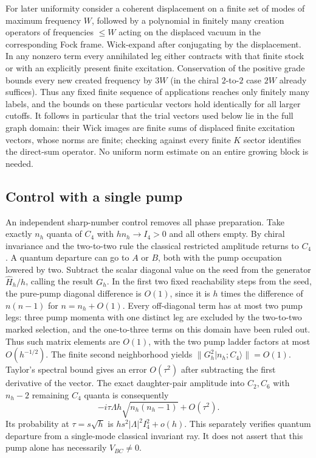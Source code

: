\documentclass[11pt]{article}
\numberwithin{equation}{section}
\begin{document}
For later uniformity consider a coherent displacement on a
finite set of modes of maximum frequency \(W\), followed by a
polynomial in finitely many creation operators of frequencies
\(\le W\) acting on the displaced vacuum in the corresponding
Fock frame. Wick-expand after conjugating by the displacement.
In any nonzero term every annihilated leg either contracts
with that finite stock or with an explicitly present finite
excitation. Conservation of the positive grade bounds every
new created frequency by \(3W\) (in the chiral \(2\)-to-\(2\)
case \(2W\) already suffices). Thus any fixed finite sequence
of applications reaches only finitely many labels, and the
bounds on these particular vectors hold identically for all
larger cutoffs. It follows in particular that the trial vectors
used below lie in the full graph domain: their Wick images
are finite sums of displaced finite excitation vectors, whose
norms are finite; checking against every finite \(K\) sector
identifies the direct-sum operator. No uniform norm estimate
on an entire growing block is needed.

\subsection{Control with a single pump}

An independent sharp-number control removes all phase
preparation. Take exactly \(n_h\) quanta of \(C_4\) with
\(h n_h\to I_4>0\) and all others empty. By chiral invariance
and the two-to-two rule the classical restricted amplitude
returns to \(C_4\). A quantum departure can go to \(A\) or
\(B\), both with the pump occupation lowered by two.
Subtract the scalar diagonal value on the seed from the
generator \(\widehat H_h/h\), calling the result \(G_h\).
In the first two fixed reachability steps from the seed,
the pure-pump diagonal difference is \(O(1)\), since it
is \(h\) times the difference of \(n(n-1)\) for
\(n=n_h+O(1)\). Every off-diagonal term has at most two
pump legs: three pump momenta with one distinct leg are
excluded by the two-to-two marked selection, and the
one-to-three terms on this domain have been ruled out.
Thus such matrix elements are \(O(1)\), with the two pump
ladder factors at most \(O(h^{-1/2})\).
The finite second neighborhood yields
\(\|G_h^2|n_h;C_4\rangle\|=O(1)\).
Taylor's spectral bound gives an error \(O(\tau^2)\)
after subtracting the first derivative of the vector.
The exact daughter-pair amplitude into \(C_2,C_6\) with
\(n_h-2\) remaining \(C_4\) quanta is consequently
\[
 -i\tau\Lambda h\sqrt{n_h(n_h-1)}+O(\tau^2).
\]
Its probability at \(\tau=s\sqrt h\) is
\(h s^2|\Lambda|^2I_4^2+o(h)\).
This separately verifies quantum departure from a
single-mode classical invariant ray. It does not assert
that this pump alone has necessarily \(V_{BC}\ne0\).
\end{document}
